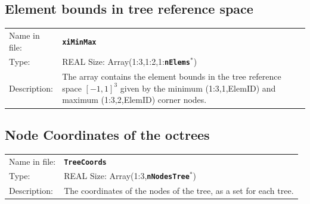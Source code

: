 \documentclass[a4paper,headsepline]{scrreprt}
\newcommand\ttbf[1]{\textbf{\texttt{#1}}}
\newcommand\nElems{\ttbf{nElems}}
\newcommand\nNodesTree{\ttbf{nNodesTree}}
\begin{document}
\subsection{Element bounds in tree reference space}
\begin{tabularx}{1.0\textwidth}{lX}
Name in  file: & \textbf{\texttt{xiMinMax}}\\
Type:         & REAL \quad Size: Array(1:3,1:2,1:\nElems$^*$) \\
Description:  & The array contains the element bounds in the tree reference space $[-1,1]^3$ given by the minimum (1:3,1,ElemID) and maximum (1:3,2,ElemID) corner nodes. \\
\end{tabularx}


\subsection{Node Coordinates of the octrees}
\begin{tabularx}{1.0\textwidth}{lX}
Name in  file: & \textbf{\texttt{TreeCoords}}\\
Type:         & REAL \quad Size: Array(1:3,\nNodesTree$^*$) \\
Description:  & The coordinates of the nodes of the tree, as a set for each tree. \\
\end{tabularx}



%
\end{document}
